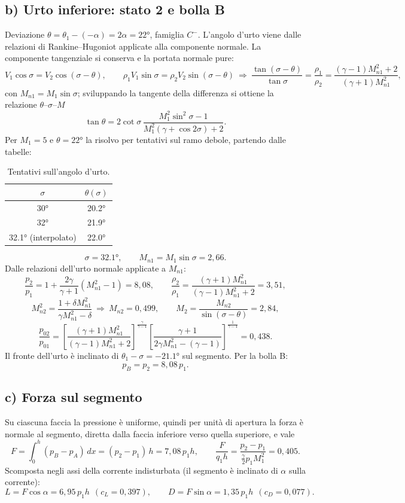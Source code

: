 \documentclass[11pt,a4paper]{article}
\newcommand{\Cm}{C^{-}}
\begin{document}
\subsection*{b) Urto inferiore: stato 2 e bolla B}
Deviazione $\theta=\theta_1-(-\alpha)=2\alpha=\ang{22}$, famiglia $\Cm$. L'angolo d'urto viene dalle relazioni di
Rankine--Hugoniot applicate alla componente normale. La componente tangenziale si conserva e la portata normale pure:
\[
V_1\cos\sigma=V_2\cos(\sigma-\theta),\qquad \rho_1V_1\sin\sigma=\rho_2V_2\sin(\sigma-\theta)
\ \Rightarrow\ \frac{\tan(\sigma-\theta)}{\tan\sigma}=\frac{\rho_1}{\rho_2}=\frac{(\gamma-1)M_{n1}^2+2}{(\gamma+1)M_{n1}^2},
\]
con $M_{n1}=M_1\sin\sigma$; sviluppando la tangente della differenza si ottiene la relazione $\theta$--$\sigma$--$M$
\[
\tan\theta=2\cot\sigma\,\frac{M_1^2\sin^2\sigma-1}{M_1^2(\gamma+\cos2\sigma)+2}.
\]
Per $M_1=5$ e $\theta=\ang{22}$ la risolvo per tentativi sul ramo debole, partendo dalle tabelle:
\begin{table}[H]
  \centering
  \small
  \begin{tabular}{cc}
    \toprule
    $\sigma$ & $\theta(\sigma)$ \\
    \midrule
    \ang{30} & \ang{20.2} \\
    \ang{32} & \ang{21.9} \\
    \ang{32.1} (interpolato) & \ang{22.0} \\
    \bottomrule
  \end{tabular}
  \caption{Tentativi sull'angolo d'urto.}
\end{table}
\[
\sigma=\ang{32.1},\qquad M_{n1}=M_1\sin\sigma=2{,}66 .
\]
Dalle relazioni dell'urto normale applicate a $M_{n1}$:
\[
\frac{p_2}{p_1}=1+\frac{2\gamma}{\gamma+1}\left(M_{n1}^2-1\right)=8{,}08,\qquad
\frac{\rho_2}{\rho_1}=\frac{(\gamma+1)M_{n1}^2}{(\gamma-1)M_{n1}^2+2}=3{,}51,
\]
\[
M_{n2}^2=\frac{1+\delta M_{n1}^2}{\gamma M_{n1}^2-\delta}\ \Rightarrow\ M_{n2}=0{,}499,\qquad
M_2=\frac{M_{n2}}{\sin(\sigma-\theta)}=2{,}84,
\]
\[
\frac{p_{02}}{p_{01}}=\left[\frac{(\gamma+1)M_{n1}^2}{(\gamma-1)M_{n1}^2+2}\right]^{\frac{\gamma}{\gamma-1}}
\left[\frac{\gamma+1}{2\gamma M_{n1}^2-(\gamma-1)}\right]^{\frac{1}{\gamma-1}}=0{,}438 .
\]
Il fronte dell'urto è inclinato di $\theta_1-\sigma=\ang{-21.1}$ sul segmento. Per la bolla B:
\[
p_B=p_2=8{,}08\,p_1 .
\]

\subsection*{c) Forza sul segmento}
Su ciascuna faccia la pressione è uniforme, quindi per unità di apertura la forza è normale al segmento, diretta
dalla faccia inferiore verso quella superiore, e vale
\[
F=\int_0^h(p_B-p_A)\,dx=(p_2-p_1)\,h=7{,}08\,p_1h,\qquad \frac{F}{q_1h}=\frac{p_2-p_1}{\tfrac{\gamma}{2}p_1M_1^2}=0{,}405 .
\]
Scomposta negli assi della corrente indisturbata (il segmento è inclinato di $\alpha$ sulla corrente):
\[
L=F\cos\alpha=6{,}95\,p_1h\ \ (c_L=0{,}397),\qquad D=F\sin\alpha=1{,}35\,p_1h\ \ (c_D=0{,}077).
\]
\end{document}
